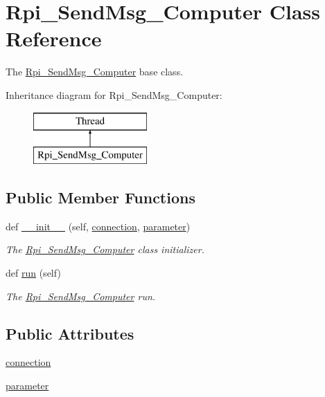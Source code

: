 \hypertarget{a00045}{}\section{Rpi\+\_\+\+Send\+Msg\+\_\+\+Computer Class Reference}
\label{a00045}


The \hyperlink{a00045}{Rpi\+\_\+\+Send\+Msg\+\_\+\+Computer} base class.  


Inheritance diagram for Rpi\+\_\+\+Send\+Msg\+\_\+\+Computer\+:\begin{figure}[H]
\begin{center}
\leavevmode
\includegraphics[height=2.000000cm]{a00045}
\end{center}
\end{figure}
\subsection*{Public Member Functions}
\begin{DoxyCompactItemize}
\item 
def \hyperlink{a00045_ab31bcaed710c978236824fea1cc5c9f4}{\+\_\+\+\_\+init\+\_\+\+\_\+} (self, \hyperlink{a00045_a10275a078bd1abcbebc206cc5d19e18b}{connection}, \hyperlink{a00045_a0d71b5c1dcca8d3fee88d6a11d3e2071}{parameter})
\begin{DoxyCompactList}\small\item\em The \hyperlink{a00045}{Rpi\+\_\+\+Send\+Msg\+\_\+\+Computer} class initializer. \end{DoxyCompactList}\item 
def \hyperlink{a00045_ad22709b2e67308af35f55680d5a026e0}{run} (self)
\begin{DoxyCompactList}\small\item\em The \hyperlink{a00045}{Rpi\+\_\+\+Send\+Msg\+\_\+\+Computer} run. \end{DoxyCompactList}\end{DoxyCompactItemize}
\subsection*{Public Attributes}
\begin{DoxyCompactItemize}
\item 
\hyperlink{a00045_a10275a078bd1abcbebc206cc5d19e18b}{connection}
\item 
\hyperlink{a00045_a0d71b5c1dcca8d3fee88d6a11d3e2071}{parameter}
\end{DoxyCompactItemize}


